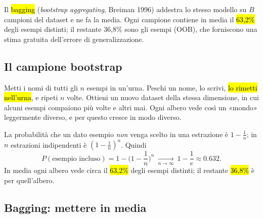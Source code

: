 
\begin{inbreve}
Il \hl{bagging} (\emph{bootstrap aggregating}, Breiman 1996) addestra lo stesso modello su $B$ campioni  del dataset e ne fa la media. Ogni campione contiene in media il \hl{63{,}2\%} degli esempi distinti; il restante 36{,}8\% sono gli esempi  (OOB), che forniscono una stima gratuita dell'errore di generalizzazione.
\end{inbreve}

\subsection{Il campione bootstrap}

\begin{intuizione}
Metti i nomi di tutti gli $n$ esempi in un'urna. Peschi un nome, lo scrivi, \hl{lo rimetti nell'urna}, e ripeti $n$ volte. Ottieni un nuovo dataset della stessa dimensione, in cui alcuni esempi compaiono più volte e altri mai. Ogni albero vede così un «mondo» leggermente diverso, e per questo cresce in modo diverso.
\end{intuizione}

\begin{tecnica}
La probabilità che un dato esempio \emph{non} venga scelto in una estrazione è $1-\frac1n$; in $n$ estrazioni indipendenti è $\left(1-\frac1n\right)^n$. Quindi
\[
P(\text{esempio incluso})=1-\Big(1-\frac1n\Big)^{n}\ \xrightarrow[n\to\infty]{}\ 1-\frac1e\approx 0.632 .
\]
In media ogni albero vede circa il \hl{63{,}2\%} degli esempi distinti; il restante \hl{36{,}8\%} è  per quell'albero.
\end{tecnica}

\par\noindent\begin{minipage}{\linewidth}
\end{minipage}\par

\subsection{Bagging: mettere in media}

